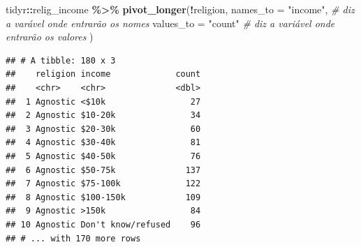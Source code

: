 \documentclass[
  10pt,
  ignorenonframetext,
]{beamer}
\newenvironment{Shaded}{\begin{snugshade}}{\end{snugshade}}
\newcommand{\CommentTok}[1]{\textcolor[rgb]{0.56,0.35,0.01}{\textit{#1}}}
\newcommand{\DataTypeTok}[1]{\textcolor[rgb]{0.13,0.29,0.53}{#1}}
\newcommand{\KeywordTok}[1]{\textcolor[rgb]{0.13,0.29,0.53}{\textbf{#1}}}
\newcommand{\NormalTok}[1]{#1}
\newcommand{\OperatorTok}[1]{\textcolor[rgb]{0.81,0.36,0.00}{\textbf{#1}}}
\newcommand{\StringTok}[1]{\textcolor[rgb]{0.31,0.60,0.02}{#1}}
\begin{document}
\begin{frame}[fragile]{}
\protect\hypertarget{section}{}
\begin{Shaded}
\begin{Highlighting}[]
\NormalTok{tidyr}\OperatorTok{::}\NormalTok{relig\_income }\OperatorTok{\%\textgreater{}\%}
\StringTok{  }\KeywordTok{pivot\_longer}\NormalTok{(}\OperatorTok{!}\NormalTok{religion, }
               \DataTypeTok{names\_to =} \StringTok{"income"}\NormalTok{, }\CommentTok{\# diz a varável onde entrarão os nomes}
               \DataTypeTok{values\_to =} \StringTok{"count"} \CommentTok{\# diz a variável onde entrarão os valores}
\NormalTok{               )}
\end{Highlighting}
\end{Shaded}

\begin{verbatim}
## # A tibble: 180 x 3
##    religion income             count
##    <chr>    <chr>              <dbl>
##  1 Agnostic <$10k                 27
##  2 Agnostic $10-20k               34
##  3 Agnostic $20-30k               60
##  4 Agnostic $30-40k               81
##  5 Agnostic $40-50k               76
##  6 Agnostic $50-75k              137
##  7 Agnostic $75-100k             122
##  8 Agnostic $100-150k            109
##  9 Agnostic >150k                 84
## 10 Agnostic Don't know/refused    96
## # ... with 170 more rows
\end{verbatim}
\end{frame}
\end{document}
